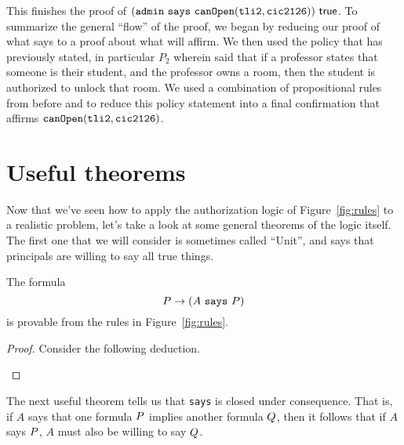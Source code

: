 \documentclass[11pt,twoside]{scrartcl}
\begin{document}
\begin{sequentdeduction}[array]
 {
}
\end{sequentdeduction}
This finishes the proof of $(\texttt{\upshape admin}~\texttt{\upshape says}~\texttt{\upshape canOpen}(\texttt{\upshape tli2},\texttt{\upshape cic2126}))~\mathsf{true}$. To summarize the general ``flow'' of the proof, we began by reducing our proof of what \admin says to a proof about what \admin will affirm. We then used the policy that \admin has previously stated, in particular $P_2$ wherein \admin said that if a professor states that someone is their student, and the professor owns a room, then the student is authorized to unlock that room. We used a combination of propositional rules from before and  to reduce this policy statement into a final confirmation that \admin affirms $\texttt{\upshape canOpen}(\texttt{\upshape tli2},\texttt{\upshape cic2126})$.

\section{Useful theorems}

Now that we've seen how to apply the authorization logic of Figure~\ref{fig:rules} to a realistic problem, let's take a look at some general theorems of the logic itself. The first one that we will consider is sometimes called ``Unit'', and says that principals are willing to say all true things.

\begin{theorem}[Unit]
The formula
\[
P \rightarrow (A~\texttt{\upshape says}~P)
\]
is provable from the rules in Figure~\ref{fig:rules}.
\end{theorem}
\begin{proof}
Consider the following deduction.
\begin{sequentdeduction}[array]
 {
}
\end{sequentdeduction}
\end{proof}

The next useful theorem tells us that \verb'says' is closed under consequence. That is, if $A$ says that one formula $P$ implies another formula $Q$, then it follows that if $A$ says $P$, $A$ must also be willing to say $Q$.
\end{document}

